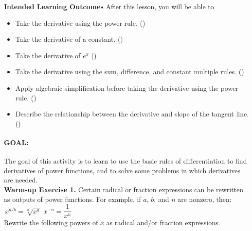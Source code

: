 \documentclass[10pt]{article}
\begin{document}
\pagestyle{otherpages}
\thispagestyle{firstpage}

\textbf{Intended Learning Outcomes}
After this lesson, you will be able to 

\begin{itemize}
    \item Take the derivative using the power rule. ()
    \item Take the derivative of a constant. ()
    \item Take the derivative of $e^x$ ()
    \item Take the derivative using the sum, difference, and constant multiple rules. ()
    \item Apply algebraic simplification before taking the derivative using the power rule. ()
    \item Describe the relationship between the derivative and slope of the tangent line.()
\end{itemize}

\vspace{-0.5cm}

\hrulefill
\paragraph*{GOAL:} The goal of this activity is to learn to use the basic rules of differentiation to find derivatives of power functions, and to solve some problems in which derivatives are needed.\\

{\bf\color{blue} Warm-up Exercise 1.} Certain radical or fraction expressions can be rewritten as outputs of power functions. For example, if $a$, $b$, and $n$ are nonzero, then:\\

\,\hfill $x^{a/b} = \sqrt[b]{x^a}$ \hfill $x^{-n} = \dfrac{1}{x^n}$ \hfill\,\\

Rewrite the following powers of $x$ as radical and/or fraction expressions.
\end{document}
